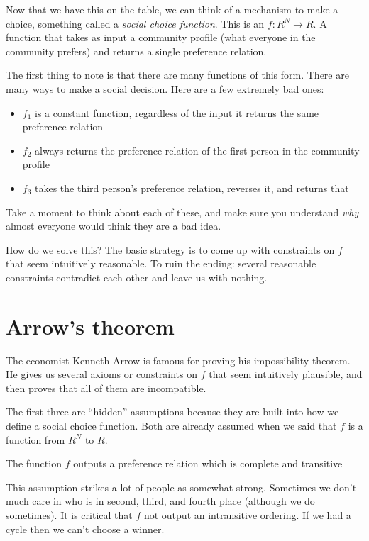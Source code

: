 Now that we have this on the table, we can think of a mechanism to make a choice, something called a {\it social choice function}.  This is an $f:  R^N \to R$.  A function that takes as input a community profile (what everyone in the community prefers) and returns a single preference relation.

The first thing to note is that there are many functions of this form. There are many ways to make a social decision.  Here are a few extremely bad ones:
\begin{itemize}
    \item $f_1$ is a constant function, regardless of the input it returns the same preference relation
    \item $f_2$ always returns the preference relation of the first person in the community profile
    \item $f_3$ takes the third person's preference relation, reverses it, and returns that
\end{itemize}
Take a moment to think about each of these, and make sure you understand {\it why} almost everyone would think they are a bad idea.

How do we solve this? The basic strategy is to come up with constraints on $f$ that seem intuitively reasonable.  To ruin the ending: several reasonable constraints contradict each other and leave us with nothing.

\section{Arrow's theorem}

The economist Kenneth Arrow is famous for proving his impossibility theorem.  He gives us several axioms or constraints on $f$ that seem intuitively plausible, and then proves that all of them are incompatible.

The first three are ``hidden'' assumptions because they are built into how we define a social choice function.  Both are already assumed when we said that $f$ is a function from $R^N$ to $R$.
\begin{definition}
The function $f$ outputs a preference relation which is complete and transitive
\end{definition}
This assumption strikes a lot of people as somewhat strong.  Sometimes we don't much care in who is in second, third, and fourth place (although we do sometimes). It is critical that $f$ not output an intransitive ordering.  If we had a cycle then we can't choose a winner.

